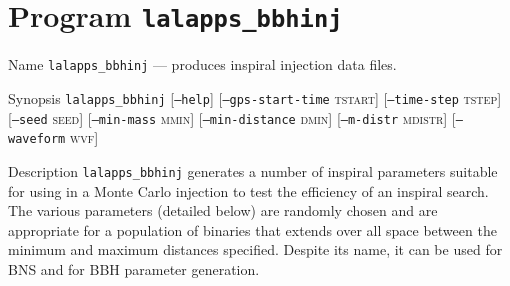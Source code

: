 \section{Program \texttt{lalapps\_bbhinj}}
\label{program:lalapps-bbhinj}

\begin{entry}
\item[Name]
\verb$lalapps_bbhinj$ --- produces inspiral injection data files.

\item[Synopsis]
\verb$lalapps_bbhinj$ \newline
%
[\texttt{--help}]\newline
%
[\texttt{--gps-start-time} \textsc{tstart}]\newline
%
[\texttt{--time-step} \textsc{tstep}] \newline
%
[\texttt{--seed} \textsc{seed}]\newline
%
[\texttt{--min-mass} \textsc{mmin}]   \newline
%
[\texttt{--min-distance} \textsc{dmin}]  \newline
%
[\texttt{--m-distr} \textsc{mdistr}]  \newline
%
[\texttt{--waveform} \textsc{wvf}] \newline
%


\item[Description] 
\verb$lalapps_bbhinj$
generates a number of inspiral  parameters suitable  for using in a Monte
Carlo injection to test the efficiency of an inspiral search.  The  various
parameters (detailed  below)  are randomly chosen and are appropriate for
a population of binaries that extends over all space between
the minimum and maximum distances specified.
Despite its name, it can be used for BNS and for BBH parameter generation.


\end{entry}
